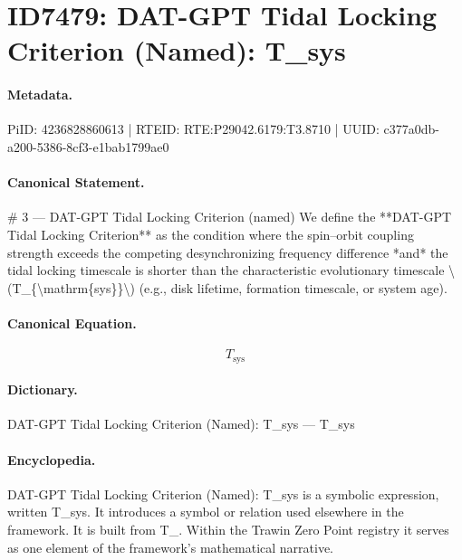 \section*{ID7479: DAT-GPT Tidal Locking Criterion (Named): T\_sys}
\paragraph{Metadata.}
PiID: 4236828860613 | RTEID: RTE:P29042.6179:T3.8710 | UUID: c377a0db-a200-5386-8cf3-e1bab1799ae0

\paragraph{Canonical Statement.}
\# 3 — DAT-GPT Tidal Locking Criterion (named) We define the **DAT-GPT Tidal Locking Criterion** as the condition where the spin–orbit coupling strength exceeds the competing desynchronizing frequency difference *and* the tidal locking timescale is shorter than the characteristic evolutionary timescale \textbackslash{}(T\_\{\textbackslash{}mathrm\{sys\}\}\textbackslash{}) (e.g., disk lifetime, formation timescale, or system age).

\paragraph{Canonical Equation.}
\[
T_{\mathrm{sys}}
\]

\paragraph{Dictionary.}
DAT-GPT Tidal Locking Criterion (Named): T\_sys — T\_sys

\paragraph{Encyclopedia.}
DAT-GPT Tidal Locking Criterion (Named): T\_sys is a symbolic expression, written T\_sys. It introduces a symbol or relation used elsewhere in the framework. It is built from T\_. Within the Trawin Zero Point registry it serves as one element of the framework's mathematical narrative.

